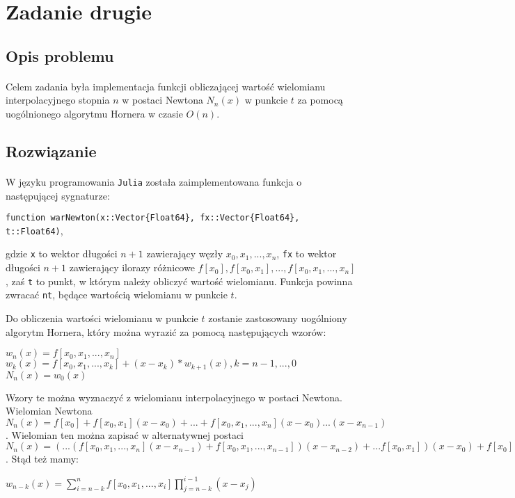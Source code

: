 \documentclass[a4paper]{article}
\theoremstyle{plain}
\begin{document}
\section{Zadanie drugie}

\subsection{Opis problemu}
\paragraph{}
Celem zadania była implementacja funkcji obliczającej wartość wielomianu interpolacyjnego stopnia $n$ w postaci Newtona $N_{n}(x)$ w punkcie $t$ za pomocą uogólnionego algorytmu Hornera w czasie $O(n)$.

\subsection{Rozwiązanie}
\paragraph{}
W języku programowania \texttt{Julia} została zaimplementowana funkcja o następującej sygnaturze:
\begin{center}
\texttt{function warNewton(x::Vector\{Float64\}, fx::Vector\{Float64\}, t::Float64)},
\end{center}

gdzie \texttt{x} to wektor długości $n + 1$ zawierający węzły $x_{0}, x_{1}, ..., x_{n}$, \texttt{fx} to wektor długości $n + 1$ zawierający ilorazy różnicowe $f[x_{0}], f[x_{0}, x_{1}], ..., f[x_{0}, x_{1}, ..., x_{n}]$, zaś \texttt{t} to punkt, w którym należy obliczyć wartość wielomianu. Funkcja powinna zwracać \texttt{nt}, będące wartością wielomianu w punkcie $t$.

Do obliczenia wartości wielomianu w punkcie $t$ zostanie zastosowany uogólniony algorytm Hornera, który można wyrazić za pomocą następujących wzorów:

\begin{center}
$w_{n}(x) = f[x_{0}, x_{1}, ..., x_{n}]$\\
$w_{k}(x) = f[x_{0}, x_{1}, ..., x_{k}] + (x - x_{k}) * w_{k + 1}(x), k = n - 1, ..., 0$\\
$N_{n}(x) = w_{0}(x)$
\end{center}

Wzory te można wyznaczyć z wielomianu interpolacyjnego w postaci Newtona.
Wielomian Newtona $N_{n}(x) = f[x_{0}] + f[x_{0}, x_{1}](x - x_{0}) + ... + f[x_{0}, x_{1}, ..., x_{n}](x - x_{0})...(x-x_{n - 1})$. Wielomian ten można zapisać w alternatywnej postaci $N_{n}(x) = (...(f[x_{0}, x_{1}, ..., x_{n}](x - x_{n - 1}) + f[x_{0}, x_{1}, ..., x_{n - 1}])(x - x_{n - 2}) + ...  f[x_{0}, x_{1}])(x - x_{0}) + f[x_{0}]$. Stąd też mamy:
\begin{center}
$w_{n - k}(x) =  \sum_{i = n - k}^{n} f[x_{0}, x_{1}, ..., x_{i}] \prod_{j = n - k}^{i - 1} (x - x_{j}) $
\end{center}
\end{document}
